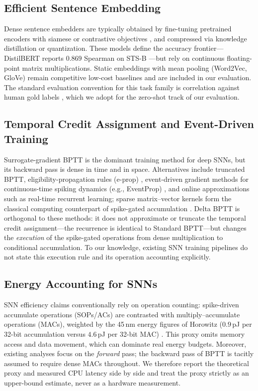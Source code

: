 \documentclass[10pt,journal,compsoc]{IEEEtran}
\begin{document}
\subsection{Efficient Sentence Embedding}
Dense sentence embedders are typically obtained by fine-tuning pretrained encoders with siamese \cite{reimers2019sentence} or contrastive objectives \cite{gao2021simcse}, and compressed via knowledge distillation \cite{hinton2015distilling, sanh2019distilbert, wang2020minilm} or quantization. These models define the accuracy frontier---DistilBERT reports $0.869$ Spearman on STS-B \cite{sanh2019distilbert}---but rely on continuous floating-point matrix multiplications. Static embeddings with mean pooling (Word2Vec, GloVe) remain competitive low-cost baselines and are included in our evaluation. The standard evaluation convention for this task family is correlation against human gold labels \cite{muennighoff2022mteb, cer2017semeval}, which we adopt for the zero-shot track of our evaluation.

\subsection{Temporal Credit Assignment and Event-Driven Training}
Surrogate-gradient BPTT \cite{neftci2019surrogate} is the dominant training method for deep SNNs, but its backward pass is dense in time and in space. Alternatives include truncated BPTT, eligibility-propagation rules (e-prop) \cite{bellec2020solution}, event-driven gradient methods for continuous-time spiking dynamics (e.g., EventProp) \cite{wunderlich2021event}, and online approximations such as real-time recurrent learning; sparse matrix--vector kernels form the classical computing counterpart of spike-gated accumulation \cite{zenke2021remarkable}. Delta BPTT is orthogonal to these methods: it does not approximate or truncate the temporal credit assignment---the recurrence is identical to Standard BPTT---but changes the \emph{execution} of the spike-gated operations from dense multiplication to conditional accumulation. To our knowledge, existing SNN training pipelines do not state this execution rule and its operation accounting explicitly.

\subsection{Energy Accounting for SNNs}
SNN efficiency claims conventionally rely on operation counting: spike-driven accumulate operations (SOPs/ACs) are contrasted with multiply--accumulate operations (MACs), weighted by the 45\,nm energy figures of Horowitz \cite{horowitz2014computing} ($0.9$\,pJ per 32-bit accumulation versus $4.6$\,pJ per 32-bit MAC) \cite{zhou2023spikformer, fang2023spikingjelly}. This proxy omits memory access and data movement, which can dominate real energy budgets. Moreover, existing analyses focus on the \textit{forward} pass; the backward pass of BPTT is tacitly assumed to require dense MACs throughout. We therefore report the theoretical proxy and measured CPU latency side by side and treat the proxy strictly as an upper-bound estimate, never as a hardware measurement.
\end{document}
